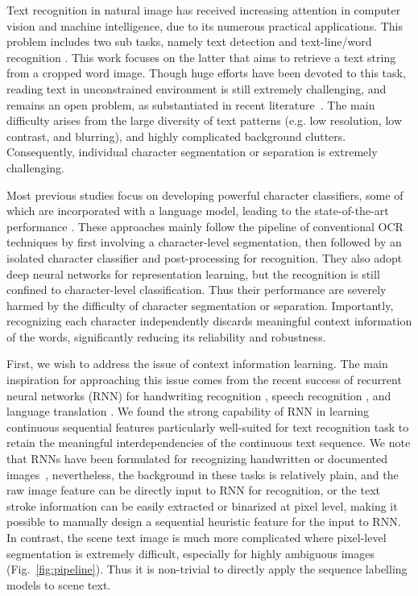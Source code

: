 \documentclass[letterpaper]{article}
\begin{document}
 Text recognition in natural image has received increasing attention in computer vision and machine intelligence, due to its numerous practical applications. This problem includes two sub tasks, namely text detection \cite{Huang2014,Yin2014,He2015,Zhang2015,Huang2013,Neumann2013} and text-line/word recognition \cite{Jaderberg2014,Almazan2014,Jaderberg2014b,Bissacco2013,Yao2014}. This work focuses on the latter that aims to retrieve a text string from a cropped word image.
Though huge efforts have been devoted to this task, reading text in unconstrained environment is still extremely challenging, and remains an open problem, as substantiated in recent
literature~\cite{Jaderberg2015b,Almazan2014}.
The main difficulty arises from the large diversity of text patterns (e.g. low resolution, low contrast, and blurring), and highly complicated background clutters.
Consequently, individual character segmentation or separation is extremely challenging.


Most previous studies focus on developing powerful character classifiers, some of which are incorporated with a language model, leading to the state-of-the-art performance \cite{Jaderberg2014,Bissacco2013,Yao2014,Lee2014}.
These approaches mainly follow the pipeline of conventional OCR techniques by first involving a character-level segmentation, then followed by an isolated character classifier and post-processing for recognition.
They also adopt deep neural networks for representation learning, but the recognition is still confined to character-level classification.
Thus their performance are severely harmed by the difficulty of character segmentation or separation. Importantly, recognizing each character independently discards meaningful context information of the words, significantly reducing its reliability and robustness.

First, we wish to address the issue of context information learning.
The main inspiration for approaching this issue comes from the recent success of recurrent neural networks (RNN) for handwriting recognition \cite{Graves2009,Graves2008}, speech recognition \cite{Graves2014}, and language translation \cite{Sutskever2014}.
We found the strong capability of RNN in learning continuous sequential features particularly well-suited for text recognition task to retain the meaningful interdependencies of the continuous text sequence.
We note that RNNs have been formulated for recognizing handwritten or documented images~\cite{Graves2009,Graves2008,Breuel2013}, nevertheless, the background in these tasks is relatively plain, and the raw image feature can be directly input to RNN for recognition, or the text stroke information can be easily extracted or binarized at pixel level, making it possible to manually design a sequential heuristic feature for the input to RNN.
In contrast, the scene text image is much more complicated where pixel-level segmentation is extremely difficult, especially for highly ambiguous images (Fig.~\ref{fig:pipeline}). Thus it is non-trivial to directly apply the sequence labelling models to scene text.
\end{document}
